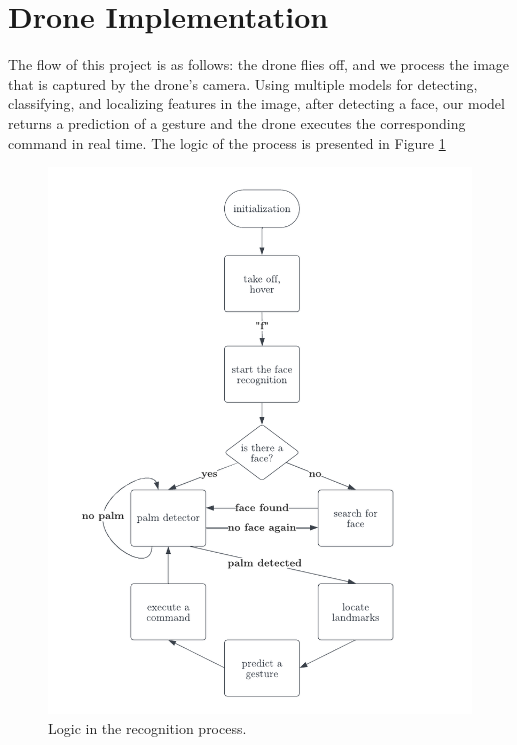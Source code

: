 \section{Drone Implementation}

The flow of this project is as follows: the drone flies off, and we process the image that is captured by the drone's camera. Using multiple models for detecting, classifying, and localizing features in the image, after detecting a face, our model returns a prediction of a gesture and the drone executes the corresponding command in real time. The logic of the process is presented in Figure \ref{fig:flowchart}


\begin{figure}
	\centering
	\includegraphics[width =1.1 \textwidth]{images/flowchart.pdf}
	\caption{Logic in the recognition process.}
	\label{fig:flowchart}
\end{figure}

